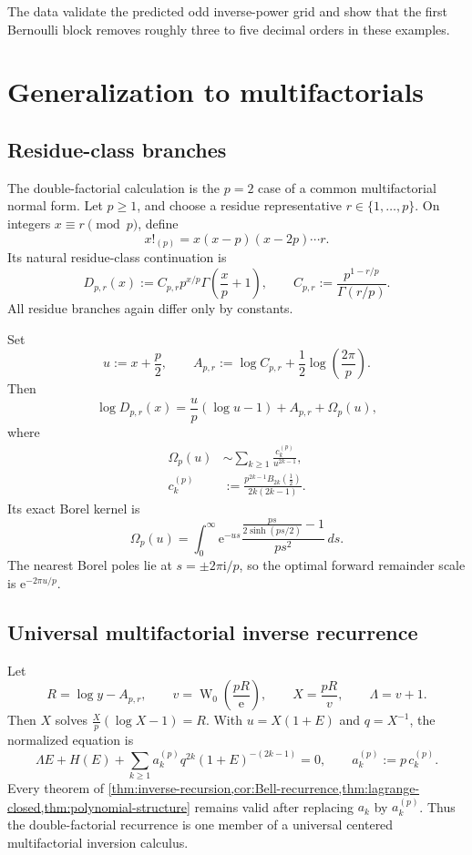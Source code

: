 \documentclass[11pt,a4paper,oneside]{book}
\newcommand{\e}{\mathrm e}
\newcommand{\ii}{\mathrm i}
\newcommand{\W}{\operatorname W}
\begin{document}
The data validate the predicted odd inverse-power grid and show that the first
Bernoulli block removes roughly three to five decimal orders in these examples.

\chapter{Generalization to multifactorials}

\section{Residue-class branches}

The double-factorial calculation is the \(p=2\) case of a common
multifactorial normal form.  Let \(p\ge1\), and choose a residue representative
\(r\in\{1,\ldots,p\}\).  On integers \(x\equiv r\pmod p\), define
\[
 x!_{(p)}=x(x-p)(x-2p)\cdots r.
\]
Its natural residue-class continuation is
\begin{equation}\label{eq:multi-branch}
 D_{p,r}(x)
 :=
 C_{p,r}p^{x/p}\Gamma\!\left(\frac{x}{p}+1\right),
 \qquad
 C_{p,r}:=\frac{p^{1-r/p}}{\Gamma(r/p)}.
\end{equation}
All residue branches again differ only by constants.

Set
\[
 u:=x+\frac p2,
 \qquad
 A_{p,r}:=
 \log C_{p,r}+\frac12\log\!\left(\frac{2\pi}{p}\right).
\]
Then
\begin{equation}\label{eq:multi-normal}
 \log D_{p,r}(x)
 =
 \frac{u}{p}(\log u-1)+A_{p,r}+\Omega_p(u),
\end{equation}
where
\begin{align}
 \Omega_p(u)
 &\sim\sum_{k\ge1}
 \frac{c_k^{(p)}}{u^{2k-1}},\label{eq:multi-Omega}\\
 c_k^{(p)}
 &:=
 \frac{p^{2k-1}B_{2k}(\tfrac12)}
 {2k(2k-1)}.\label{eq:multi-c}
\end{align}
Its exact Borel kernel is
\begin{equation}\label{eq:multi-borel}
 \Omega_p(u)
 =
 \int_0^\infty\e^{-us}
 \frac{\frac{ps}{2\sinh(ps/2)}-1}{ps^2}\,ds.
\end{equation}
The nearest Borel poles lie at \(s=\pm2\pi\ii/p\), so the optimal forward
remainder scale is \(\e^{-2\pi u/p}\).

\section{Universal multifactorial inverse recurrence}

Let
\[
 R=\log y-A_{p,r},\qquad
 v=\W_0\!\left(\frac{pR}{\e}\right),\qquad
 X=\frac{pR}{v},\qquad
 \Lambda=v+1.
\]
Then \(X\) solves \(\frac Xp(\log X-1)=R\).  With
\(u=X(1+E)\) and \(q=X^{-1}\), the normalized equation is
\begin{equation}\label{eq:multi-master}
 \Lambda E+H(E)
 +\sum_{k\ge1}
 a_k^{(p)}q^{2k}(1+E)^{-(2k-1)}=0,
 \qquad
 a_k^{(p)}:=p\,c_k^{(p)}.
\end{equation}
Every theorem of \cref{thm:inverse-recursion,cor:Bell-recurrence,thm:lagrange-closed,thm:polynomial-structure} remains valid after replacing
\(a_k\) by \(a_k^{(p)}\).  Thus the double-factorial recurrence is one member
of a universal centered multifactorial inversion calculus.
\end{document}

